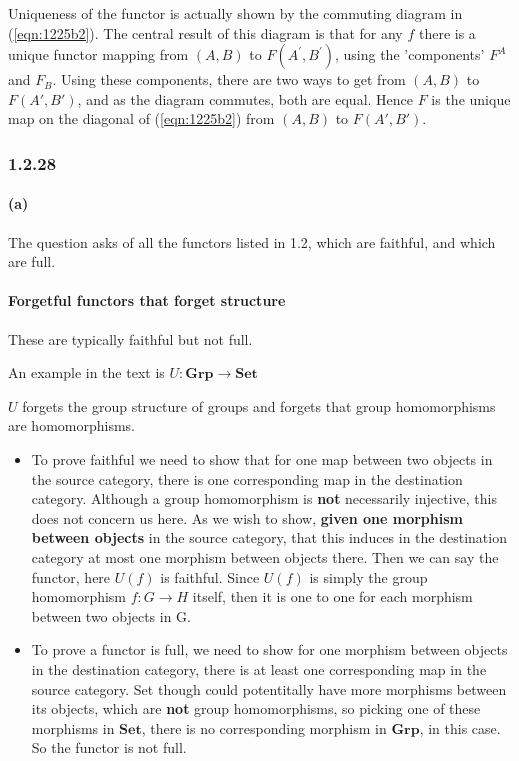 \documentclass{article}
\begin{document}
Uniqueness of the functor is actually shown by the commuting diagram in (\ref{eqn:1225b2}). The central result of this diagram is that for any $f$ there is a unique functor mapping from $(A,B)$ to $F(A^{\prime},B^{\prime})$, using the 'components' $F^A$ and $F_B$. Using these components, there are two ways to get from $(A,B)$ to $F(A',B')$, and as the diagram commutes, both are equal. Hence $F$ is the unique map on the diagonal of (\ref{eqn:1225b2}) from $(A,B)$ to $F(A',B')$.

\subsubsection*{1.2.28}

\paragraph{(a)}

The question asks of all the functors listed in 1.2, which are faithful, and which are full.

\paragraph{Forgetful functors that forget structure}

These are typically faithful but not full.

An example in the text is $U\colon\textbf{Grp} \rightarrow \textbf{Set}$

$U$ forgets the group structure of groups and forgets that group homomorphisms are homomorphisms.

\begin{itemize}
\item To prove faithful we need to show that for one map between two objects in the source category, there is one corresponding map in the destination category. Although a group homomorphism is \textbf{not} necessarily injective, this does not concern us here. As we wish to show, \textbf{given one morphism between objects} in the source category, that this induces in the destination category at most one morphism between objects there. Then we can say the functor, here $U(f)$ is faithful. Since $U(f)$ is simply the group homomorphism $f\colon G \rightarrow H$ itself, then it is one to one for each morphism between two objects in G.

\item To prove a functor is full, we need to show for one morphism between objects in the destination category, there is at least one corresponding map in the source category. Set though could potentitally have more morphisms between its objects, which are \textbf{not} group homomorphisms, so picking one of these morphisms in $\textbf{Set}$, there is no corresponding morphism in $\textbf{Grp}$, in this case. So the functor is not full.
\end{itemize}
\end{document}
